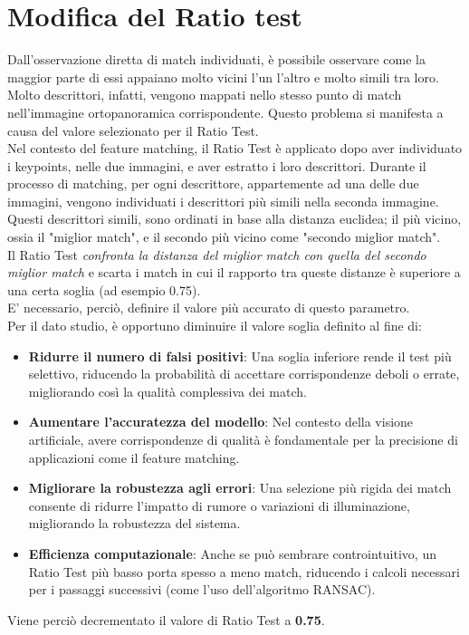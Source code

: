 \documentclass[12pt,a4paper,openright,twoside]{book}
\begin{document}
\section{Modifica del Ratio test}
Dall'osservazione diretta di match individuati, è possibile osservare come la maggior parte di essi appaiano molto vicini l'un l'altro e molto simili tra loro. Molto descrittori, infatti, vengono mappati nello stesso punto di match nell'immagine ortopanoramica corrispondente. Questo problema si manifesta a causa del valore selezionato per il Ratio Test. \\
Nel contesto del feature matching, il Ratio Test è applicato dopo aver individuato i keypoints, nelle due immagini, e aver estratto i loro descrittori. Durante il processo di matching, per ogni descrittore, appartemente ad una delle due immagini,  vengono individuati i descrittori più simili nella seconda immagine. Questi descrittori simili, sono ordinati in base alla distanza euclidea; il più vicino, ossia il "miglior match", e il secondo più vicino come "secondo miglior match".\\
Il Ratio Test {\itshape confronta la distanza del miglior match con quella del secondo miglior match} e scarta i match in cui il rapporto tra queste distanze è superiore a una certa soglia (ad esempio 0.75).\\
E' necessario, perciò, definire il valore più accurato di questo parametro.\\
Per il dato studio, è opportuno diminuire il valore soglia definito al fine di:
\begin{itemize}
\item \textbf{Ridurre il numero di falsi positivi}: Una soglia inferiore rende il test più selettivo, riducendo la probabilità di accettare corrispondenze deboli o errate, migliorando così la qualità complessiva dei match.
\item \textbf{Aumentare l'accuratezza del modello}: Nel contesto della visione artificiale, avere corrispondenze di qualità è fondamentale per la precisione di applicazioni come il feature matching.
\item \textbf{Migliorare la robustezza agli errori}: Una selezione più rigida dei match consente di ridurre l’impatto di rumore o variazioni di illuminazione, migliorando la robustezza del sistema.
\item \textbf{Efficienza computazionale}: Anche se può sembrare controintuitivo, un Ratio Test più basso porta spesso a meno match, riducendo i calcoli necessari per i passaggi successivi (come l'uso dell'algoritmo RANSAC).
\end{itemize}
Viene perciò decrementato il valore di Ratio Test a \textbf{0.75}.\\
\end{document}
